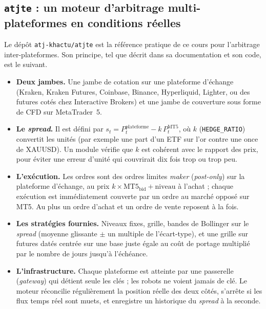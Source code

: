 \subsection{\texttt{atjte} : un moteur d'arbitrage multi-plateformes en conditions réelles}\label{c0:atjte}

Le dépôt \texttt{atj-khactu/atjte} \citep{atjte} est la référence pratique de ce cours pour l'arbitrage inter-plateformes. Son principe, tel que décrit dans sa documentation et son code, est le suivant.

\begin{itemize}
\item \textbf{Deux jambes.} Une jambe de cotation sur une plateforme d'échange (Kraken, Kraken Futures, Coinbase, Binance, Hyperliquid, Lighter, ou des futures cotés chez Interactive Brokers) et une jambe de couverture sous forme de CFD sur MetaTrader~5.
\item \textbf{Le \emph{spread}.} Il est défini par $s_t = P^{\text{plateforme}}_t - k\,P^{\text{MT5}}_t$, où $k$ (\texttt{HEDGE\_RATIO}) convertit les unités (par exemple une part d'un ETF sur l'or contre une once de XAUUSD). Un module vérifie que $k$ est cohérent avec le rapport des prix, pour éviter une erreur d'unité qui couvrirait dix fois trop ou trop peu.
\item \textbf{L'exécution.} Les ordres sont des ordres limites \emph{maker} (\emph{post-only}) sur la plateforme d'échange, au prix $k\times\text{MT5}_{\text{bid}} + \text{niveau}$ à l'achat ; chaque exécution est immédiatement couverte par un ordre au marché opposé sur MT5. Au plus un ordre d'achat et un ordre de vente reposent à la fois.
\item \textbf{Les stratégies fournies.} Niveaux fixes, grille, bandes de Bollinger sur le \emph{spread} (moyenne glissante $\pm$ un multiple de l'écart-type), et une grille sur futures datés centrée sur une base \og juste\fg{} égale au coût de portage multiplié par le nombre de jours jusqu'à l'échéance.
\item \textbf{L'infrastructure.} Chaque plateforme est atteinte par une passerelle (\emph{gateway}) qui détient seule les clés ; les robots ne voient jamais de clé. Le moteur réconcilie régulièrement la position réelle des deux côtés, s'arrête si les flux temps réel sont muets, et enregistre un historique du \emph{spread} à la seconde.
\end{itemize}

